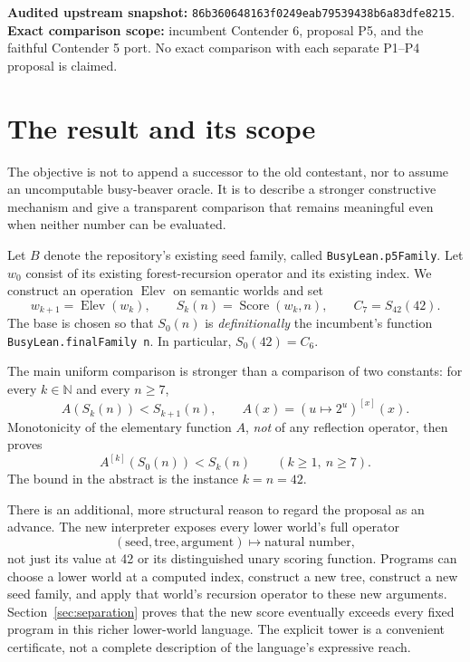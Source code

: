\documentclass[11pt]{article}
\theoremstyle{definition}
\theoremstyle{remark}
\newcommand{\N}{\mathbb N}
\newcommand{\Score}{\operatorname{Score}}
\newcommand{\Elev}{\operatorname{Elev}}
\newcommand{\code}[1]{\texttt{#1}}
\newcommand{\funiter}[2]{#1^{[#2]}}
\begin{document}
\vspace{0.4em}
\noindent\textbf{Audited upstream snapshot:}\;
\texttt{86b360648163f0249eab79539438b6a83dfe8215}.\\
\textbf{Exact comparison scope:} incumbent Contender 6, proposal P5, and the
faithful Contender 5 port. No exact comparison with each separate P1--P4
proposal is claimed.

\newpage
\begingroup
\small
\setlength{\parskip}{0pt}
\tableofcontents
\endgroup
\newpage

\section{The result and its scope}

The objective is not to append a successor to the old contestant, nor to
assume an uncomputable busy-beaver oracle. It is to describe a stronger
constructive mechanism and give a transparent comparison that remains
meaningful even when neither number can be evaluated.

Let $B$ denote the repository's existing seed family, called
\code{BusyLean.p5Family}. Let $w_0$ consist of its existing forest-recursion
operator and its existing index. We construct an operation $\Elev$ on
semantic worlds and set
\begin{equation}\label{eq:main}
 w_{k+1}=\Elev(w_k),\qquad
 S_k(n)=\Score(w_k,n),\qquad
 C_7=S_{42}(42).
\end{equation}
The base is chosen so that $S_0(n)$ is \emph{definitionally} the incumbent's
function \code{BusyLean.finalFamily n}. In particular, $S_0(42)=C_6$.

The main uniform comparison is stronger than a comparison of two constants:
for every $k\in\N$ and every $n\ge7$,
\begin{equation}\label{eq:growth-overview}
                   A(S_k(n))<S_{k+1}(n),
 \qquad A(x)=\funiter{(u\mapsto 2^u)}{x}(x).
\end{equation}
Monotonicity of the elementary function $A$, \emph{not} of any reflection
operator, then proves
\begin{equation}\label{eq:orbit-overview}
 \funiter A{k}(S_0(n))<S_k(n)\qquad(k\ge1,\ n\ge7).
\end{equation}
The bound in the abstract is the instance $k=n=42$.

There is an additional, more structural reason to regard the proposal as an
advance. The new interpreter exposes every lower world's full operator
\[
 (\text{seed},\text{tree},\text{argument})\longmapsto\text{natural number},
\]
not just its value at 42 or its distinguished unary scoring function.
Programs can choose a lower world at a computed index, construct a new tree,
construct a new seed family, and apply that world's recursion operator to
these new arguments. Section~\ref{sec:separation} proves that the new score
eventually exceeds every fixed program in this richer lower-world language.
The explicit tower is a convenient certificate, not a complete description
of the language's expressive reach.
\end{document}
